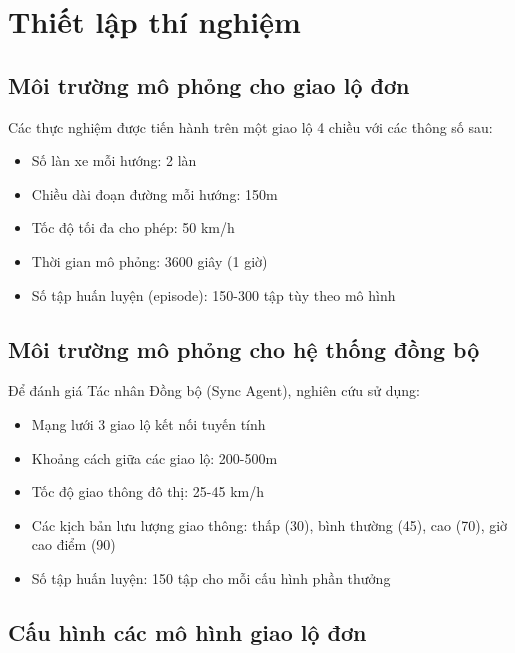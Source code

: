 \section{Thiết lập thí nghiệm}

\subsection{Môi trường mô phỏng cho giao lộ đơn}
Các thực nghiệm được tiến hành trên một giao lộ 4 chiều với các thông số sau:
\begin{itemize}
    \item Số làn xe mỗi hướng: 2 làn

    \item Chiều dài đoạn đường mỗi hướng: 150m

    \item Tốc độ tối đa cho phép: 50 km/h

    \item Thời gian mô phỏng: 3600 giây (1 giờ)

    \item Số tập huấn luyện (episode): 150-300 tập tùy theo mô hình
\end{itemize}

\subsection{Môi trường mô phỏng cho hệ thống đồng bộ}
Để đánh giá Tác nhân Đồng bộ (Sync Agent), nghiên cứu sử dụng:
\begin{itemize}
    \item Mạng lưới 3 giao lộ kết nối tuyến tính

    \item Khoảng cách giữa các giao lộ: 200-500m

    \item Tốc độ giao thông đô thị: 25-45 km/h

    \item Các kịch bản lưu lượng giao thông: thấp (30), bình thường (45), cao (70), giờ cao
        điểm (90)

    \item Số tập huấn luyện: 150 tập cho mỗi cấu hình phần thưởng
\end{itemize}

\subsection{Cấu hình các mô hình giao lộ đơn}

